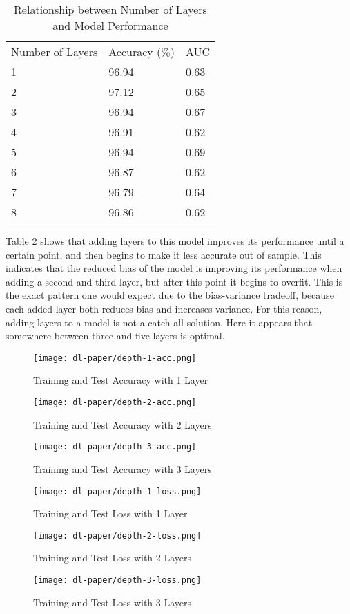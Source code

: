 \documentclass[12pt]{article}  %
\theoremstyle{definition}
\theoremstyle{remark}
\begin{document}
\begin{table}[!h]
\centering
\caption{Relationship between Number of Layers and Model Performance}
\label{my-label}
\begin{tabular}{lll}
Number of Layers & Accuracy (\%) & AUC  \\
1                & 96.94         & 0.63 \\
2                & 97.12         & 0.65 \\
3                & 96.94         & 0.67 \\
4                & 96.91         & 0.62 \\
5                & 96.94         & 0.69 \\
6                & 96.87         & 0.62 \\
7                & 96.79         & 0.64 \\
8                & 96.86         & 0.62
\end{tabular}
\end{table}

\par Table 2 shows that adding layers to this model improves its performance until a certain point, and then begins to make it less accurate out of sample. This indicates that the reduced bias of the model is improving its performance when adding a second and third layer, but after this point it begins to overfit. This is the exact pattern one would expect due to the bias-variance tradeoff, because each added layer both reduces bias and increases variance. For this reason, adding layers to a model is not a catch-all solution. Here it appears that somewhere between three and five layers is optimal. 

\begin{figure}[!h]
  \texttt{[image: dl-paper/depth-1-acc.png]}
  \caption{Training and Test Accuracy with 1 Layer}\label{1-layer}
\endminipage\hfill
{}
  \texttt{[image: dl-paper/depth-2-acc.png]}
  \caption{Training and Test Accuracy with 2 Layers}\label{2-layers}
\endminipage\hfill
{}%
  \texttt{[image: dl-paper/depth-3-acc.png]}
  \caption{Training and Test Accuracy with 3 Layers}\label{3-layers}
\endminipage
\end{figure}


\begin{figure}[!h]
  \texttt{[image: dl-paper/depth-1-loss.png]}
  \caption{Training and Test Loss with 1 Layer}\label{1-layers}
\endminipage\hfill
{}
  \texttt{[image: dl-paper/depth-2-loss.png]}
  \caption{Training and Test Loss with 2 Layers}\label{2-layers}
\endminipage\hfill
{}%
  \texttt{[image: dl-paper/depth-3-loss.png]}
  \caption{Training and Test Loss with 3 Layers}\label{3-layers}
\endminipage
\end{figure}
\end{document}
